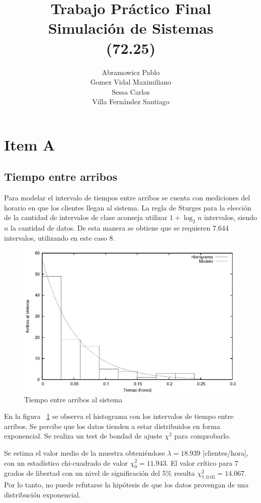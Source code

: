 \documentclass[a4paper,10pt]{article}
\title{Trabajo Pr\'actico Final\\ Simulaci\'on de Sistemas\\ (72.25)}
\author{
Abramowicz Pablo\\
Gomez Vidal Maximiliano\\
Sessa Carlos\\
Villa Fern\'andez Santiago\\
}
\begin{document}
\maketitle

\section*{Item A}

\subsection*{Tiempo entre arribos}


Para modelar el intervalo de tiempos entre arribos se cuenta con mediciones del
horario en que los clientes llegan al sistema. La regla de
Sturges para la elecci\'on de la cantidad de intervalos de clase 
aconseja utilizar $1 + \log_2 n$ intervalos, siendo $n$
la cantidad de datos. De esta manera se obtiene que se requieren $7.644$ intervalos,
utilizando en este caso $8$. 

\begin{figure}[hp]
\centering
\includegraphics{graficos/histograma_llegadas.eps}
\caption{Tiempo entre arribos al sistema}
\label{fig:tiempoentrearribos}
\end{figure}


En la figura ~\ref{fig:tiempoentrearribos} se observa el histograma con los
intervalos de tiempo entre arribos. Se percibe que los datos tienden a estar
distribuidos en forma exponencial. Se realiza un test de bondad de ajuste
$\chi^2$ para comprobarlo.


Se estima el valor medio de la muestra obteni\'endose 
$\lambda = 18.939$ [clientes/hora],
con un estad\'istico chi-cuadrado de valor $\chi_0^2 = 11.943$. 
El valor cr\'itico para $7$ grados de libertad con un nivel
de significaci\'on del $5\%$ resulta $\chi_{7,0.05}^2 = 14.067$. Por lo tanto,
no puede refutarse la hip\'otesis de que los datos provengan de una distribuci\'on 
exponencial.
\end{document}
